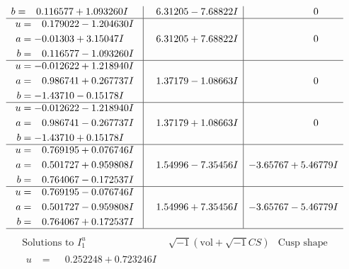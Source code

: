 \documentclass[1p]{elsarticle_modified}
\theoremstyle{definition}
\newcommand{\I}{\sqrt{-1}}
\begin{document}
$$\begin{array}{c|c|c}
\begin{aligned}
b &= \phantom{-}0.116577 + 1.093260 I\end{aligned}
 & \phantom{-}6.31205 - 7.68822 I & \phantom{-0.000000 } 0 \\ \hline\begin{aligned}
u &= \phantom{-}0.179022 - 1.204630 I \\
a &= -0.01303 + 3.15047 I \\
b &= \phantom{-}0.116577 - 1.093260 I\end{aligned}
 & \phantom{-}6.31205 + 7.68822 I & \phantom{-0.000000 } 0 \\ \hline\begin{aligned}
u &= -0.012622 + 1.218940 I \\
a &= \phantom{-}0.986741 + 0.267737 I \\
b &= -1.43710 - 0.15178 I\end{aligned}
 & \phantom{-}1.37179 - 1.08663 I & \phantom{-0.000000 } 0 \\ \hline\begin{aligned}
u &= -0.012622 - 1.218940 I \\
a &= \phantom{-}0.986741 - 0.267737 I \\
b &= -1.43710 + 0.15178 I\end{aligned}
 & \phantom{-}1.37179 + 1.08663 I & \phantom{-0.000000 } 0 \\ \hline\begin{aligned}
u &= \phantom{-}0.769195 + 0.076746 I \\
a &= \phantom{-}0.501727 + 0.959808 I \\
b &= \phantom{-}0.764067 - 0.172537 I\end{aligned}
 & \phantom{-}1.54996 - 7.35456 I & -3.65767 + 5.46779 I \\ \hline\begin{aligned}
u &= \phantom{-}0.769195 - 0.076746 I \\
a &= \phantom{-}0.501727 - 0.959808 I \\
b &= \phantom{-}0.764067 + 0.172537 I\end{aligned}
 & \phantom{-}1.54996 + 7.35456 I & -3.65767 - 5.46779 I\\
 \hline 
 \end{array}$$\newpage$$\begin{array}{c|c|c}  
\text{Solutions to }I^u_{1}& \I (\text{vol} + \sqrt{-1}CS) & \text{Cusp shape}\\
 \hline 
\begin{aligned}
u &= \phantom{-}0.252248 + 0.723246 I \\

\end{aligned}
\end{array}$$
\end{document}
